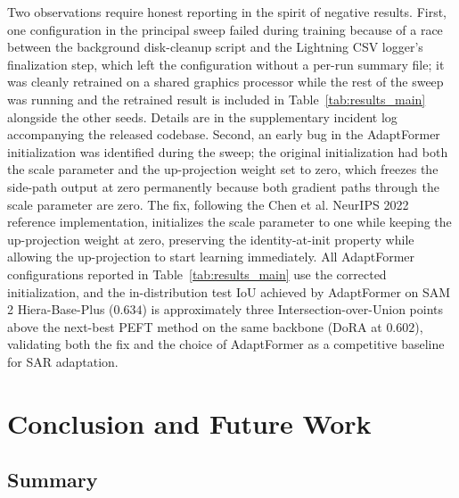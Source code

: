 \documentclass[11pt,a4paper,oneside]{report}
\begin{document}
Two observations require honest reporting in the spirit of negative results. First, one configuration in the principal sweep failed during training because of a race between the background disk-cleanup script and the Lightning CSV logger's finalization step, which left the configuration without a per-run summary file; it was cleanly retrained on a shared graphics processor while the rest of the sweep was running and the retrained result is included in Table~\ref{tab:results_main} alongside the other seeds. Details are in the supplementary incident log accompanying the released codebase. Second, an early bug in the AdaptFormer initialization was identified during the sweep; the original initialization had both the scale parameter and the up-projection weight set to zero, which freezes the side-path output at zero permanently because both gradient paths through the scale parameter are zero. The fix, following the Chen et al. NeurIPS 2022 reference implementation, initializes the scale parameter to one while keeping the up-projection weight at zero, preserving the identity-at-init property while allowing the up-projection to start learning immediately. All AdaptFormer configurations reported in Table~\ref{tab:results_main} use the corrected initialization, and the in-distribution test IoU achieved by AdaptFormer on SAM 2 Hiera-Base-Plus ($0.634$) is approximately three Intersection-over-Union points above the next-best PEFT method on the same backbone (DoRA at $0.602$), validating both the fix and the choice of AdaptFormer as a competitive baseline for SAR adaptation.

\chapter{Conclusion and Future Work}
\label{chap:conclusion}

\section{Summary}
\end{document}
